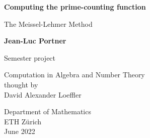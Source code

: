 \begin{titlepage}
   \begin{center}
       \vspace*{4cm}

       \textbf{Computing the prime-counting function}
	   
	   \vspace{0.5cm}
	   The Meissel-Lehmer Method

       \vspace{0.5cm}
            
       \vspace{1.5cm}

       \textbf{Jean-Luc Portner}

	   \vspace{0.8cm}
            
       Semester project
       
       \vspace{0.5cm}
       
       Computation in Algebra and Number Theory\\
	   thought by\\
	   David Alexander Loeffler
            
       \vfill
     
       Department of Mathematics\\
       ETH Zürich\\
       June 2022
            
   \end{center}
\end{titlepage}
